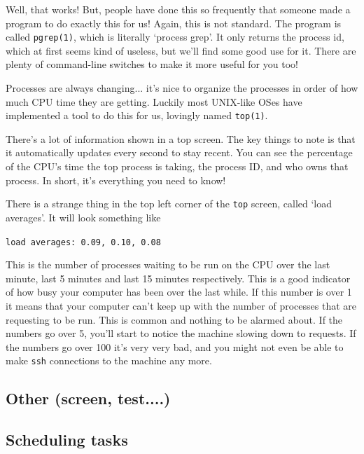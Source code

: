 Well, that works! But, people have done this so frequently that someone made a program
to do exactly this for us! Again, this is not standard. The program is called {\tt pgrep(1)},
which is literally `process grep'. It only returns the process id, which at first seems kind of useless,
but we'll find some good use for it. There are plenty of command-line switches to make it 
more useful for you too!

Processes are always changing... it's nice to organize the processes in order 
of how much CPU time they are getting. Luckily most UNIX-like OSes have implemented a
tool to do this for us, lovingly named {\tt top(1)}.


There's a lot of information shown in a top screen. The key things to note is that
it automatically updates every second to stay recent. You can see the 
percentage of the CPU's time the top process is taking, the process ID, and who owns that process.
In short, it's everything you need to know!

There is a strange thing in the top left corner of the {\tt top} screen, called `load averages'.
It will look something like

{\tt load averages: 0.09, 0.10, 0.08}

This is the number of processes waiting to be run on the CPU over the last minute, last 5 minutes and last 15 minutes respectively.
This is a good indicator of how busy your computer has been over the last while. If this number is over 1 it means that your computer
can't keep up with the number of processes that are requesting to be run. This is common and nothing to be alarmed about. If the 
numbers go over 5, you'll start to notice the machine slowing down to requests. If the numbers go over 100 it's very
very bad, and you might not even be able to make {\tt ssh} connections to the machine any more.


			
\subsection {Other (screen, test....) }


\subsection	{Scheduling tasks  }
\label{subsection:cron}

